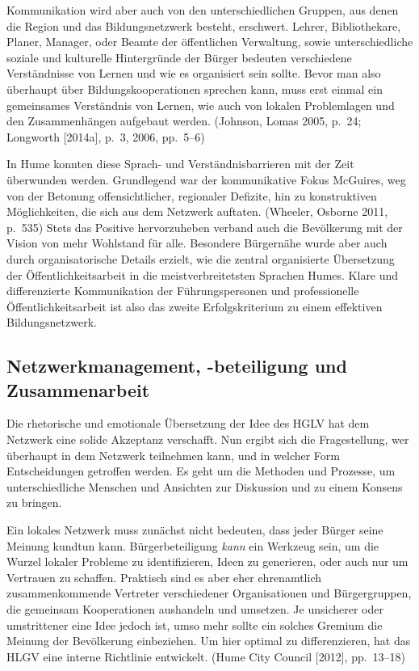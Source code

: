 \documentclass[a4paper,
fontsize=11pt,
oneside,
numbers=noperiodatend,
parskip=half-,
bibliography=totoc,
final
]{scrartcl}
\begin{document}
Kommunikation wird aber auch von den unterschiedlichen Gruppen, aus
denen die Region und das Bildungsnetzwerk besteht, erschwert. Lehrer,
Bibliothekare, Planer, Manager, oder Beamte der öffentlichen Verwaltung,
sowie unterschiedliche soziale und kulturelle Hintergründe der Bürger
bedeuten verschiedene Verständnisse von Lernen und wie es organisiert
sein sollte. Bevor man also überhaupt über Bildungskooperationen
sprechen kann, muss erst einmal ein gemeinsames Verständnis von Lernen,
wie auch von lokalen Problemlagen und den Zusammenhängen aufgebaut
werden. (Johnson, Lomas 2005, p.~24; Longworth {[}2014a{]}, p.~3, 2006,
pp.~5--6)

In Hume konnten diese Sprach- und Verständnisbarrieren mit der Zeit
überwunden werden. Grundlegend war der kommunikative Fokus McGuires, weg
von der Betonung offensichtlicher, regionaler Defizite, hin zu
konstruktiven Möglichkeiten, die sich aus dem Netzwerk auftaten.
(Wheeler, Osborne 2011, p.~535) Stets das Positive hervorzuheben verband
auch die Bevölkerung mit der Vision von mehr Wohlstand für alle.
Besondere Bürgernähe wurde aber auch durch organisatorische Details
erzielt, wie die zentral organisierte Übersetzung der
Öffentlichkeitsarbeit in die meistverbreitetsten Sprachen Humes. Klare
und differenzierte Kommunikation der Führungspersonen und professionelle
Öffentlichkeitsarbeit ist also das zweite Erfolgskriterium zu einem
effektiven Bildungsnetzwerk.

\hypertarget{netzwerkmanagement--beteiligung-und-zusammenarbeit}{%
\subsection*{Netzwerkmanagement, -beteiligung und
Zusammenarbeit}\label{netzwerkmanagement--beteiligung-und-zusammenarbeit}}

Die rhetorische und emotionale Übersetzung der Idee des HGLV hat dem
Netzwerk eine solide Akzeptanz verschafft. Nun ergibt sich die
Fragestellung, wer überhaupt in dem Netzwerk teilnehmen kann, und in
welcher Form Entscheidungen getroffen werden. Es geht um die Methoden
und Prozesse, um unterschiedliche Menschen und Ansichten zur Diskussion
und zu einem Konsens zu bringen.

Ein lokales Netzwerk muss zunächst nicht bedeuten, dass jeder Bürger
seine Meinung kundtun kann. Bürgerbeteiligung \emph{kann} ein Werkzeug
sein, um die Wurzel lokaler Probleme zu identifizieren, Ideen zu
generieren, oder auch nur um Vertrauen zu schaffen. Praktisch sind es
aber eher ehrenamtlich zusammenkommende Vertreter verschiedener
Organisationen und Bürgergruppen, die gemeinsam Kooperationen aushandeln
und umsetzen. Je unsicherer oder umstrittener eine Idee jedoch ist, umso
mehr sollte ein solches Gremium die Meinung der Bevölkerung einbeziehen.
Um hier optimal zu differenzieren, hat das HLGV eine interne Richtlinie
entwickelt. (Hume City Council {[}2012{]}, pp.~13--18)
\end{document}
